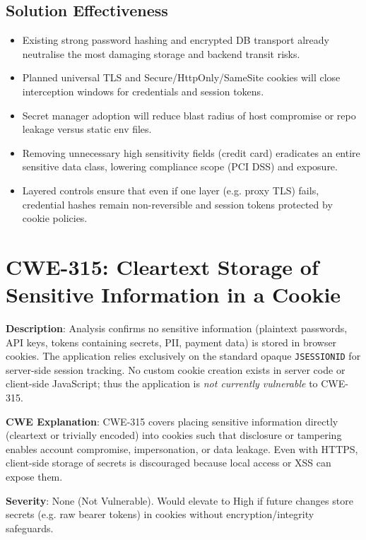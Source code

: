 \documentclass[]{UCD_CS_FYP_Report}
\begin{document}
\subsection*{Solution Effectiveness}
\begin{itemize}
	\item Existing strong password hashing and encrypted DB transport already neutralise the most damaging storage and backend transit risks.
	\item Planned universal TLS and Secure/HttpOnly/SameSite cookies will close interception windows for credentials and session tokens.
	\item Secret manager adoption will reduce blast radius of host compromise or repo leakage versus static env files.
	\item Removing unnecessary high sensitivity fields (credit card) eradicates an entire sensitive data class, lowering compliance scope (PCI DSS) and exposure.
	\item Layered controls ensure that even if one layer (e.g. proxy TLS) fails, credential hashes remain non-reversible and session tokens protected by cookie policies.
\end{itemize}

\section{CWE-315: Cleartext Storage of Sensitive Information in a Cookie}

	\textbf{Description}: Analysis confirms no sensitive information (plaintext passwords, API keys, tokens containing secrets, PII, payment data) is stored in browser cookies. The application relies exclusively on the standard opaque \texttt{JSESSIONID} for server-side session tracking. No custom cookie creation exists in server code or client-side JavaScript; thus the application is \emph{not currently vulnerable} to CWE-315.

	\textbf{CWE Explanation}: CWE-315 covers placing sensitive information directly (cleartext or trivially encoded) into cookies such that disclosure or tampering enables account compromise, impersonation, or data leakage. Even with HTTPS, client-side storage of secrets is discouraged because local access or XSS can expose them.

	\textbf{Severity}: None (Not Vulnerable). Would elevate to High if future changes store secrets (e.g. raw bearer tokens) in cookies without encryption/integrity safeguards.
\end{document}
